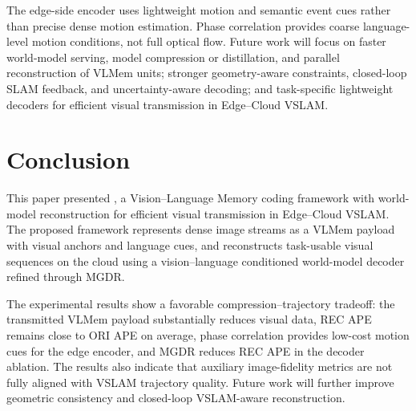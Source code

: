 The edge-side encoder uses lightweight motion and semantic event cues rather than precise dense motion estimation. Phase correlation provides coarse language-level motion conditions, not full optical flow. Future work will focus on faster world-model serving, model compression or distillation, and parallel reconstruction of VLMem units; stronger geometry-aware constraints, closed-loop SLAM feedback, and uncertainty-aware decoding; and task-specific lightweight decoders for efficient visual transmission in Edge--Cloud VSLAM.

\section{Conclusion}
\label{sec:conclusion}

This paper presented \VLMemCodec, a Vision--Language Memory coding framework with world-model reconstruction for efficient visual transmission in Edge--Cloud VSLAM. The proposed framework represents dense image streams as a VLMem payload with visual anchors and language cues, and reconstructs task-usable visual sequences on the cloud using a vision--language conditioned world-model decoder refined through MGDR.

The experimental results show a favorable compression--trajectory tradeoff: the transmitted VLMem payload substantially reduces visual data, REC APE remains close to ORI APE on average, phase correlation provides low-cost motion cues for the edge encoder, and MGDR reduces REC APE in the decoder ablation. The results also indicate that auxiliary image-fidelity metrics are not fully aligned with VSLAM trajectory quality. Future work will further improve geometric consistency and closed-loop VSLAM-aware reconstruction.
